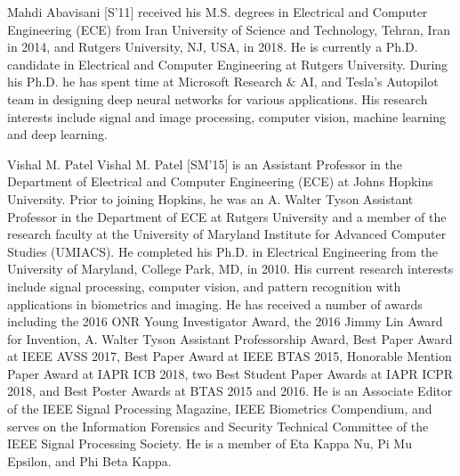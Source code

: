 \documentclass[journal]{IEEEtran}
\begin{document}


\begin{IEEEbiography}{Mahdi Abavisani}
[S'11] received his M.S. degrees in Electrical and Computer Engineering (ECE) from Iran University of Science and Technology, Tehran, Iran in 2014, and Rutgers University, NJ, USA, in 2018. He is currently a Ph.D. candidate in  Electrical and Computer Engineering at Rutgers University. During his Ph.D. he has spent time at Microsoft Research $\&$ AI, and Tesla's Autopilot team in designing deep neural networks for various applications. His research interests include signal and image processing, computer vision, machine learning  and  deep learning.
\end{IEEEbiography}

\begin{IEEEbiography}{Vishal M. Patel}
Vishal M. Patel [SM'15] is an Assistant Professor in the Department of Electrical and Computer Engineering (ECE) at Johns Hopkins University.  Prior to joining Hopkins, he was an A. Walter Tyson Assistant Professor in the Department of ECE at Rutgers University and a member of the research faculty at the University of Maryland Institute for Advanced Computer Studies (UMIACS). He completed his Ph.D. in Electrical Engineering from the University of Maryland, College Park, MD, in 2010. His current research interests include signal processing, computer vision, and pattern recognition with applications in biometrics and imaging. He has received a number of awards including the 2016 ONR Young Investigator Award, the 2016 Jimmy Lin Award for Invention, A. Walter Tyson Assistant Professorship Award, Best Paper Award at IEEE AVSS 2017, Best Paper Award at IEEE BTAS 2015, Honorable Mention Paper Award at IAPR ICB 2018, two Best Student Paper Awards at IAPR ICPR 2018, and Best Poster Awards at BTAS 2015 and 2016. He is an Associate Editor of the IEEE Signal Processing Magazine, IEEE Biometrics Compendium, and serves on the Information Forensics and Security Technical Committee of the IEEE Signal Processing Society. He is a member of Eta Kappa Nu, Pi Mu Epsilon, and Phi Beta Kappa.
\end{IEEEbiography}
\end{document}
